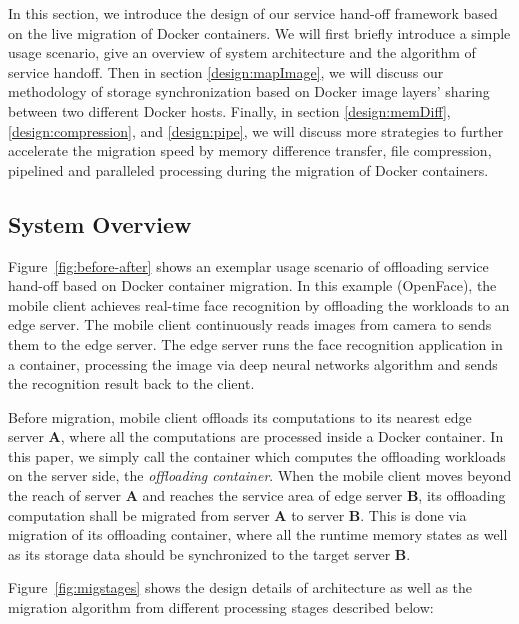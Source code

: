 


In this section, we introduce the design of our service hand-off framework based on the live migration of Docker containers. We will first briefly introduce a simple usage scenario, give an overview of system architecture and the algorithm of service handoff. Then in section \ref{design:mapImage}, we will discuss our methodology of storage synchronization based on Docker image layers' sharing between two different Docker hosts. Finally, in section \ref{design:memDiff}, \ref{design:compression}, and \ref{design:pipe}, we will discuss more strategies to further accelerate the migration speed by memory difference transfer, file compression, pipelined and paralleled processing during the migration of Docker containers.

\subsection{System Overview}

Figure~\ref{fig:before-after} shows an exemplar usage scenario of offloading service hand-off based on Docker container migration. 
In this example (OpenFace\cite{openface2016}), the mobile client achieves real-time face recognition by offloading the workloads to an edge server. 
The mobile client continuously reads images from camera to sends them to the edge server. 
The edge server runs the face recognition application in a container, processing the image via deep neural networks algorithm and sends the recognition result  back to the client. 

Before migration, mobile client offloads its computations to its nearest edge server \textbf{A}, where all the computations are processed inside a Docker container. 
In this paper, we simply call the container which computes the offloading workloads on the server side, the \textit{offloading container}.
When the mobile client moves beyond the reach of server \textbf{A} and reaches the service area of edge server \textbf{B}, its offloading computation shall be migrated from server \textbf{A} to server \textbf{B}. This is done via migration of its offloading container, where all the runtime memory states as well as its storage data should be synchronized to the target server \textbf{B}.




Figure~\ref{fig:migstages} shows the design details of architecture as well as the migration algorithm from different processing stages described below:

